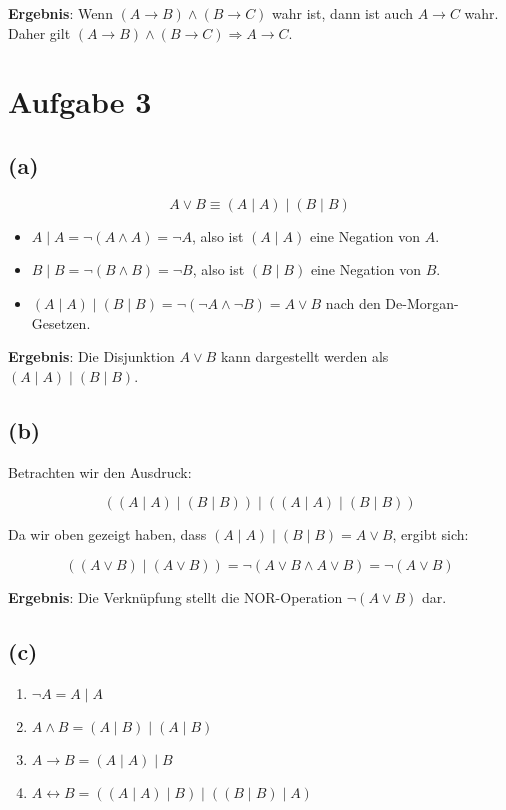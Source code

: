 \documentclass[a4paper]{scrartcl}
\begin{document}
\textbf{Ergebnis}: Wenn $(A \rightarrow B) \land (B \rightarrow C)$ wahr ist, dann ist auch $A \rightarrow C$ wahr. Daher gilt $(A \rightarrow B) \land (B \rightarrow C) \Rightarrow A \rightarrow C$.
 
\section*{Aufgabe 3}

\subsection*{(a)}

\[
A \lor B \equiv (A \mid A) \mid (B \mid B)
\]

\begin{itemize}
    \item $A \mid A = \neg (A \land A) = \neg A$, also ist $(A \mid A)$ eine Negation von $A$.
    \item $B \mid B = \neg (B \land B) = \neg B$, also ist $(B \mid B)$ eine Negation von $B$.
    \item $(A \mid A) \mid (B \mid B) = \neg(\neg A \land \neg B) = A \lor B$ nach den De-Morgan-Gesetzen.
\end{itemize}

\textbf{Ergebnis}: Die Disjunktion $A \lor B$ kann dargestellt werden als $(A \mid A) \mid (B \mid B)$.

\subsection*{(b)}

Betrachten wir den Ausdruck:

\[
((A \mid A) \mid (B \mid B)) \mid ((A \mid A) \mid (B \mid B))
\]

Da wir oben gezeigt haben, dass $(A \mid A) \mid (B \mid B) = A \lor B$, ergibt sich:

\[
((A \lor B) \mid (A \lor B)) = \neg (A \lor B \land A \lor B) = \neg (A \lor B) 
\]

\textbf{Ergebnis}: Die Verknüpfung stellt die NOR-Operation $\neg (A \lor B)$ dar.

\subsection*{(c)}

\begin{enumerate}
  \item $\neg A = A \mid A$
  \item $A \land B = (A \mid B) \mid (A \mid B)$
  \item $A \rightarrow B = (A \mid A) \mid B$
  \item $A \leftrightarrow B = ((A \mid A) \mid B) \mid ((B \mid B) \mid A)$
\end{enumerate}
\end{document}
